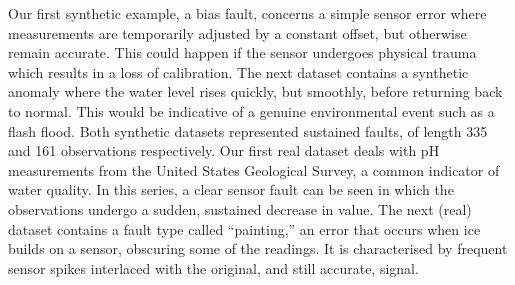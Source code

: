 \documentclass[letterpaper]{article}
\begin{document}
Our first synthetic example, a bias fault, concerns a simple sensor
error where measurements are temporarily adjusted by a constant
offset, but otherwise remain accurate. This could happen if the sensor
undergoes physical trauma which results in a loss of calibration.
The next dataset contains a synthetic anomaly where the water level
rises quickly, but smoothly, before returning back to normal. This
would be indicative of a genuine environmental event such as a flash
flood. Both synthetic datasets represented sustained faults, of length 335 and 161 observations respectively.
Our first real dataset deals with pH measurements from the United States Geological Survey, a common indicator of water quality. In this series, a clear sensor fault can be seen
in which the observations undergo a sudden, sustained decrease in value.
The next (real) dataset contains a fault type called ``painting,'' 
an error that occurs when ice builds on a sensor, obscuring some of the
readings. It is characterised by frequent sensor spikes interlaced
with the original, and still accurate, signal.

\end{document}
